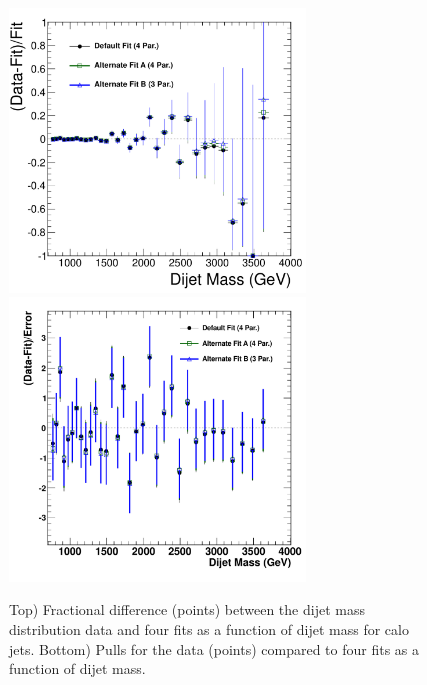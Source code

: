 \begin{figure}[!ht]
  \begin{center}
        \includegraphics[width=0.7\textwidth]{Figures/Fractional_Diff_All_calo.pdf}
        \includegraphics[width=0.7\textwidth]{Figures/Pulls_All_calo.pdf}
    \caption{ Top) Fractional difference (points) between the dijet mass distribution 
data and four fits as a function of dijet mass for calo jets.
Bottom) Pulls for the data (points) compared to four fits as a function of dijet mass.}
    \label{dijetmassFits_calo}
  \end{center}
\end{figure}


\clearpage
